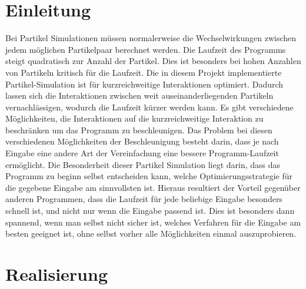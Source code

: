 \documentclass[
	12pt,
	a4paper,
	BCOR10mm,
	DIV14,
	headsepline,
]{scrreprt}
\begin{document}
\tableofcontents

\chapter{Einleitung}
\label{Einleitung}

Bei Partikel Simulationen müssen normalerweise die Wechselwirkungen zwischen jedem möglichen Partikelpaar berechnet werden. Die Laufzeit des Programms steigt quadratisch zur Anzahl der Partikel. Dies ist besonders bei hohen Anzahlen von Partikeln kritisch für die Laufzeit. Die in diesem Projekt implementierte Partikel-Simulation ist für kurzreichweitige Interaktionen optimiert. Dadurch lassen sich die Interaktionen zwischen weit auseinanderliegenden Partikeln vernachlässigen, wodurch die Laufzeit kürzer werden kann. Es gibt verschiedene Möglichkeiten, die Interaktionen auf die kurzreichweitige Interaktion zu beschränken um das Programm zu beschleunigen. Das Problem bei diesen verschiedenen Möglichkeiten der Beschleunigung besteht darin, dass je nach Eingabe eine andere Art der Vereinfachung eine bessere Programm-Laufzeit ermöglicht. Die Besonderheit dieser Partikel Simulation liegt darin, dass das Programm zu beginn selbst entscheiden kann, welche Optimierungsstrategie für die gegebene Eingabe am sinnvollsten ist. Hieraus resultiert der Vorteil gegenüber anderen Programmen, dass die Laufzeit für jede beliebige Eingabe besonders schnell ist, und nicht nur wenn die Eingabe passend ist. Dies ist besonders dann spannend, wenn man selbst nicht sicher ist, welches Verfahren für die Eingabe am besten geeignet ist, ohne selbst vorher alle Möglichkeiten einmal auszuprobieren.

\chapter{Realisierung}
\label{Realisierung}
\end{document}
